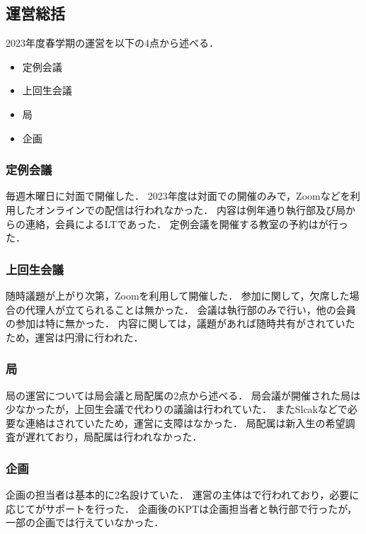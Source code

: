 \subsection*{運営総括}


2023年度春学期の運営を以下の4点から述べる．
\begin{itemize}
    \item 定例会議
    \item 上回生会議
    \item 局
    \item 企画
\end{itemize}

\subsubsection*{定例会議}
毎週木曜日に対面で開催した．
2023年度は対面での開催のみで，Zoomなどを利用したオンラインでの配信は行われなかった．
内容は例年通り執行部及び局からの連絡，会員によるLTであった．
定例会議を開催する教室の予約は\kensuiChief{}が行った．

\subsubsection*{上回生会議}
随時議題が上がり次第，Zoomを利用して開催した．
参加に関して，欠席した場合の代理人が立てられることは無かった．
会議は執行部のみで行い，他の会員の参加は特に無かった．
内容に関しては，議題があれば随時共有がされていたため，運営は円滑に行われた．

\subsubsection*{局}
局の運営については局会議と局配属の2点から述べる．
局会議が開催された局は少なかったが，上回生会議で代わりの議論は行われていた．
またSlcakなどで必要な連絡はされていたため，運営に支障はなかった．
局配属は新入生の希望調査が遅れており，局配属は行われなかった．

\subsubsection*{企画}
企画の担当者は基本的に2名設けていた．
運営の主体は\secondGrade{}で行われており，必要に応じて\thirdGrade{}がサポートを行った．
企画後のKPTは企画担当者と執行部で行ったが，一部の企画では行えていなかった．
